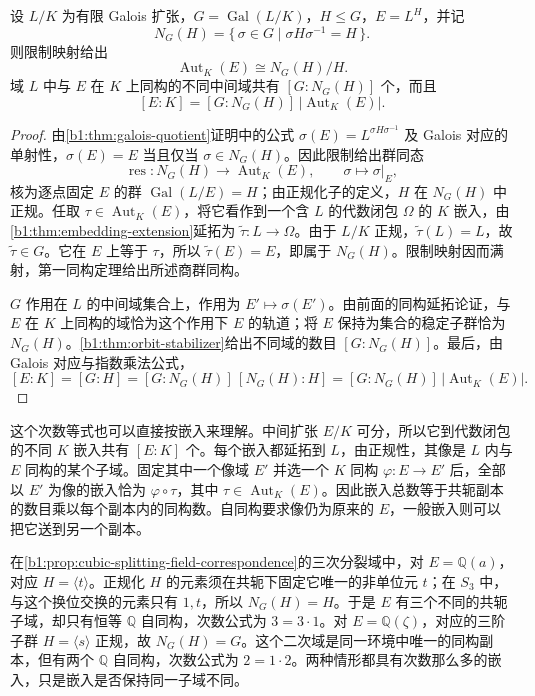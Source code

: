 \begin{proposition}\label{b1:prop:subfield-normalizer-automorphisms}
	设 \(L/K\) 为有限 Galois 扩张，\(G=\operatorname{Gal}(L/K)\)，\(H\leq G\)，\(E=L^H\)，并记
	\[
		N_G(H)=\{\,\sigma\in G\mid\sigma H\sigma^{-1}=H\,\}.
	\]
	则限制映射给出
	\[
		\operatorname{Aut}_K(E)\cong N_G(H)/H.
	\]
	域 \(L\) 中与 \(E\) 在 \(K\) 上同构的不同中间域共有 \([G:N_G(H)]\) 个，而且
	\[
		[E:K]=[G:N_G(H)]\,|\operatorname{Aut}_K(E)|.
	\]
\end{proposition}
\begin{proof}
	由\cref{b1:thm:galois-quotient}证明中的公式 \(\sigma(E)=L^{\sigma H\sigma^{-1}}\) 及 Galois 对应的单射性，\(\sigma(E)=E\) 当且仅当 \(\sigma\in N_G(H)\)。因此限制给出群同态
	\[
		\operatorname{res}:N_G(H)\longrightarrow\operatorname{Aut}_K(E),\qquad \sigma\longmapsto\sigma|_E,
	\]
	核为逐点固定 \(E\) 的群 \(\operatorname{Gal}(L/E)=H\)；由正规化子的定义，\(H\) 在 \(N_G(H)\) 中正规。任取 \(\tau\in\operatorname{Aut}_K(E)\)，将它看作到一个含 \(L\) 的代数闭包 \(\Omega\) 的 \(K\) 嵌入，由\cref{b1:thm:embedding-extension}延拓为 \(\widetilde\tau:L\rightarrow\Omega\)。由于 \(L/K\) 正规，\(\widetilde\tau(L)=L\)，故 \(\widetilde\tau\in G\)。它在 \(E\) 上等于 \(\tau\)，所以 \(\widetilde\tau(E)=E\)，即属于 \(N_G(H)\)。限制映射因而满射，第一同构定理给出所述商群同构。

	\(G\) 作用在 \(L\) 的中间域集合上，作用为 \(E'\mapsto\sigma(E')\)。由前面的同构延拓论证，与 \(E\) 在 \(K\) 上同构的域恰为这个作用下 \(E\) 的轨道；将 \(E\) 保持为集合的稳定子群恰为 \(N_G(H)\)。\cref{b1:thm:orbit-stabilizer}给出不同域的数目 \([G:N_G(H)]\)。最后，由 Galois 对应与指数乘法公式，
	\[
		[E:K]=[G:H]=[G:N_G(H)]\,[N_G(H):H] =[G:N_G(H)]\,|\operatorname{Aut}_K(E)|.
	\]
\end{proof}
这个次数等式也可以直接按嵌入来理解。中间扩张 \(E/K\) 可分，所以它到代数闭包的不同 \(K\) 嵌入共有 \([E:K]\) 个。每个嵌入都延拓到 \(L\)，由正规性，其像是 \(L\) 内与 \(E\) 同构的某个子域。固定其中一个像域 \(E'\) 并选一个 \(K\) 同构 \(\varphi:E\rightarrow E'\) 后，全部以 \(E'\) 为像的嵌入恰为 \(\varphi\circ\tau\)，其中 \(\tau\in\operatorname{Aut}_K(E)\)。因此嵌入总数等于共轭副本的数目乘以每个副本内的同构数。自同构要求像仍为原来的 \(E\)，一般嵌入则可以把它送到另一个副本。

\ProseParagraphBreak
在\cref{b1:prop:cubic-splitting-field-correspondence}的三次分裂域中，对 \(E=\mathbb Q(a)\)，对应 \(H=\langle t\rangle\)。正规化 \(H\) 的元素须在共轭下固定它唯一的非单位元 \(t\)；在 \(S_3\) 中，与这个换位交换的元素只有 \(1,t\)，所以 \(N_G(H)=H\)。于是 \(E\) 有三个不同的共轭子域，却只有恒等 \(\mathbb Q\) 自同构，次数公式为 \(3=3\cdot1\)。对 \(E=\mathbb Q(\zeta)\)，对应的三阶子群 \(H=\langle s\rangle\) 正规，故 \(N_G(H)=G\)。这个二次域是同一环境中唯一的同构副本，但有两个 \(\mathbb Q\) 自同构，次数公式为 \(2=1\cdot2\)。两种情形都具有次数那么多的嵌入，只是嵌入是否保持同一子域不同。
